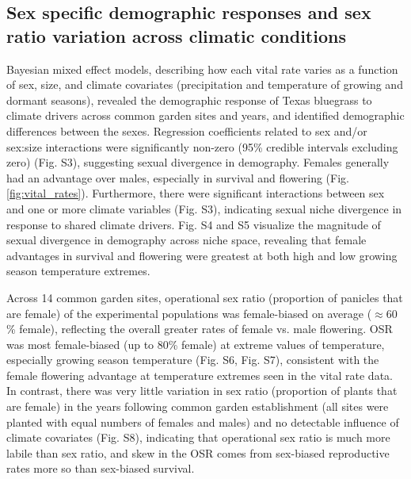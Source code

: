 \documentclass[9pt,twocolumn,twoside,lineno]{pnas-new}
\newcommand{\tom}[2]{{\color{red}{#1}}\footnote{\textit{\color{red}{#2}}}}
\newcommand{\revise}[1]{{\color{Mahogany}{#1}}}
\begin{document}
\subsection*{Sex specific demographic responses and sex ratio variation across climatic conditions}
Bayesian mixed effect models, describing how each vital rate varies as a function of sex, size, and climate covariates (precipitation and temperature of growing and dormant seasons), revealed the demographic response of Texas bluegrass to climate drivers across common garden sites and years, and identified demographic differences between the sexes. 
Regression coefficients related to sex and/or sex:size interactions were significantly non-zero (95\% credible intervals excluding zero)  \revise{particularly for flowering} (Fig. S3), suggesting sexual divergence in demography. 
Females generally had an advantage over males, especially in survival and flowering (Fig. \ref{fig:vital_rates}). 
Furthermore, there were significant interactions between sex and one or more climate variables (Fig. S3), indicating sexual niche divergence in response to shared climate drivers.  
Fig. S4 and S5 visualize the magnitude of sexual divergence in demography across niche space, revealing that female advantages in survival and flowering  were greatest at both high and low growing season temperature extremes. 

Across 14 common garden sites, operational sex ratio (proportion of panicles that are female) of the experimental populations was female-biased on average ($\approx 60$ \% female), reflecting the overall greater rates of female vs. male flowering. 
OSR was most female-biased (up to 80\% female) at extreme values of temperature, especially growing season temperature (Fig. S6, Fig. S7), consistent with the female flowering advantage at temperature extremes seen in the vital rate data. 
In contrast, there was very little variation in sex ratio (proportion of plants that are female) in the years following common garden establishment (all sites were planted with equal numbers of females and males) and no detectable influence of climate covariates (Fig. S8), indicating that operational sex ratio is much more labile than sex ratio, and skew in the OSR comes from sex-biased reproductive rates more so than sex-biased survival. 
\end{document}
